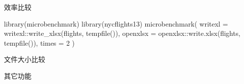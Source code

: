 \documentclass[
]{book}
\newenvironment{Shaded}{\begin{snugshade}}{\end{snugshade}}
\newcommand{\AttributeTok}[1]{\textcolor[rgb]{0.77,0.63,0.00}{#1}}
\newcommand{\CommentTok}[1]{\textcolor[rgb]{0.56,0.35,0.01}{\textit{#1}}}
\newcommand{\DecValTok}[1]{\textcolor[rgb]{0.00,0.00,0.81}{#1}}
\newcommand{\FunctionTok}[1]{\textcolor[rgb]{0.00,0.00,0.00}{#1}}
\newcommand{\NormalTok}[1]{#1}
\newcommand{\OtherTok}[1]{\textcolor[rgb]{0.56,0.35,0.01}{#1}}
\newcommand{\SpecialCharTok}[1]{\textcolor[rgb]{0.00,0.00,0.00}{#1}}
\begin{document}
效率比较

\begin{Shaded}
\begin{Highlighting}[]
\FunctionTok{library}\NormalTok{(microbenchmark)}
\FunctionTok{library}\NormalTok{(nycflights13)}
\FunctionTok{microbenchmark}\NormalTok{(}
  \AttributeTok{writexl =}\NormalTok{ writexl}\SpecialCharTok{::}\FunctionTok{write\_xlsx}\NormalTok{(flights, }\FunctionTok{tempfile}\NormalTok{()),}
  \AttributeTok{openxlsx =}\NormalTok{ openxlsx}\SpecialCharTok{::}\FunctionTok{write.xlsx}\NormalTok{(flights, }\FunctionTok{tempfile}\NormalTok{()),}
  \AttributeTok{times =} \DecValTok{2}
\NormalTok{)}
\end{Highlighting}
\end{Shaded}

文件大小比较

\begin{Shaded}
\end{Shaded}

\begin{Shaded}
\end{Shaded}

其它功能
\end{document}
